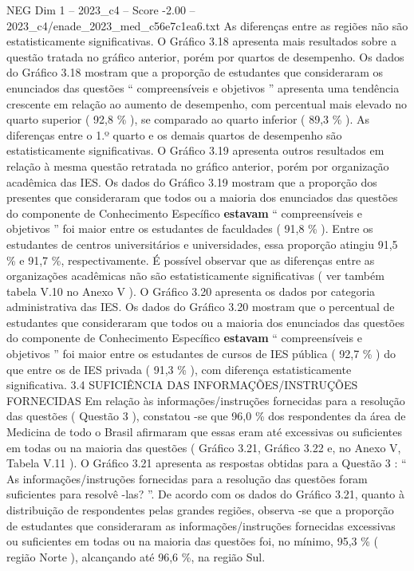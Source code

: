 \begin{textsample}{NEG Dim 1 – 2023\_c4 – Score -2.00 – 2023\_c4/enade\_2023\_med\_c56e7c1ea6.txt}
As diferenças entre as regiões não são estatisticamente significativas.
O Gráfico 3.18 apresenta mais resultados sobre a questão tratada no gráfico anterior, porém por quartos de desempenho.
Os dados do Gráfico 3.18 mostram que a proporção de estudantes que consideraram os enunciados das questões “ compreensíveis e objetivos ” apresenta uma tendência crescente em relação ao aumento de desempenho, com percentual mais elevado no quarto superior ( 92,8 \% ), se comparado ao quarto inferior ( 89,3 \% ).
As diferenças entre o 1.º quarto e os demais quartos de desempenho são estatisticamente significativas.
O Gráfico 3.19 apresenta outros resultados em relação à mesma questão retratada no gráfico anterior, porém por organização acadêmica das IES.
Os dados do Gráfico 3.19 mostram que a proporção dos presentes que consideraram que todos ou a maioria dos enunciados das questões do componente de Conhecimento Específico \textbf{estavam} “ compreensíveis e objetivos ” foi maior entre os estudantes de faculdades ( 91,8 \% ).
Entre os estudantes de centros universitários e universidades, essa proporção atingiu 91,5 \% e 91,7 \%, respectivamente.
É possível observar que as diferenças entre as organizações acadêmicas não são estatisticamente significativas ( ver também tabela V.10 no Anexo V ).
O Gráfico 3.20 apresenta os dados por categoria administrativa das IES.
Os dados do Gráfico 3.20 mostram que o percentual de estudantes que consideraram que todos ou a maioria dos enunciados das questões do componente de Conhecimento Específico \textbf{estavam} “ compreensíveis e objetivos ” foi maior entre os estudantes de cursos de IES pública ( 92,7 \% ) do que entre os de IES privada ( 91,3 \% ), com diferença estatisticamente significativa. 3.4 SUFICIÊNCIA DAS INFORMAÇÕES/INSTRUÇÕES FORNECIDAS Em relação às informações/instruções fornecidas para a resolução das questões ( Questão 3 ), constatou -se que 96,0 \% dos respondentes da área de Medicina de todo o Brasil afirmaram que essas eram até excessivas ou suficientes em todas ou na maioria das questões ( Gráfico 3.21, Gráfico 3.22 e, no Anexo V, Tabela V.11 ).
O Gráfico 3.21 apresenta as respostas obtidas para a Questão 3 : “ As informações/instruções fornecidas para a resolução das questões foram suficientes para resolvê -las? ”.
De acordo com os dados do Gráfico 3.21, quanto à distribuição de respondentes pelas grandes regiões, observa -se que a proporção de estudantes que consideraram as informações/instruções fornecidas excessivas ou suficientes em todas ou na maioria das questões foi, no mínimo, 95,3 \% ( região Norte ), alcançando até 96,6 \%, na região Sul.

\end{textsample}
